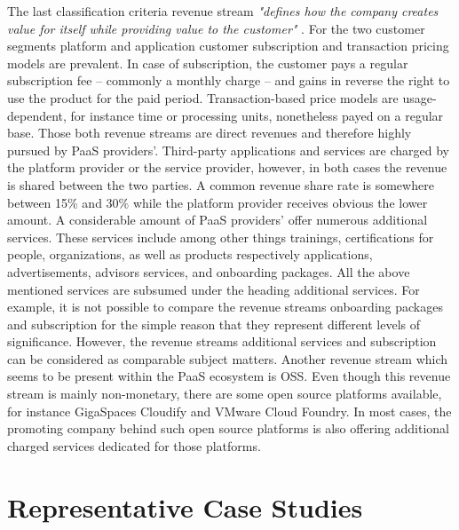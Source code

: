 The last classification criteria revenue stream \textit{"defines how the company creates value for itself while providing value to the customer"} \citep[p. 53]{Johnson2008}. For the two customer segments platform and application customer subscription and transaction pricing models are prevalent. In case of subscription, the customer pays a regular subscription fee -- commonly a monthly charge -- and gains in reverse the right to use the product for the paid period. Transaction-based price models are usage-dependent, for instance time or processing units, nonetheless payed on a regular base. Those both revenue streams are direct revenues and therefore highly pursued by \ac{PaaS} providers'. Third-party applications and services are charged by the platform provider or the service provider, however, in both cases the revenue is shared between the two parties. A common revenue share rate is somewhere between 15\% and 30\% while the platform provider receives obvious the lower amount. A considerable amount of \ac{PaaS} providers' offer numerous additional services. These services include among other things trainings, certifications for people, organizations, as well as products respectively applications, advertisements, advisors services, and onboarding packages. All the above mentioned services are subsumed under the heading additional services. For example, it is not possible to compare the revenue streams onboarding packages and subscription for the simple reason that they represent different levels of significance. However, the revenue streams additional services and subscription can be considered as comparable subject matters. Another revenue stream which seems to be present within the \ac{PaaS} ecosystem is \ac{OSS}. Even though this revenue stream is mainly non-monetary, there are some open source platforms available, for instance GigaSpaces Cloudify and VMware Cloud Foundry. In most cases, the promoting company behind such open source platforms is also offering additional charged services dedicated for those platforms.

\section{Representative Case Studies}


